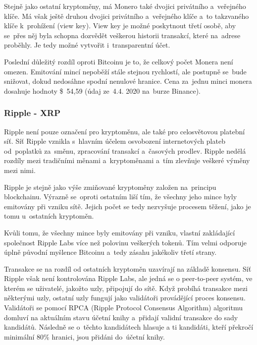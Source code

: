 \documentclass[thesis=B,czech]{FITthesis}[2019/03/21]
\begin{document}
Stejně jako ostatní kryptoměny, má Monero také dvojici privátního \linebreak a~veřejného klíče. Má však ještě druhou dvojici privátního a~veřejného klíče a~to takzvaného klíče k~prohížení (view key). View key je možné poskytnout třetí osobě, aby se~přes něj byla schopna dozvědět veškerou historii transakcí, které na~adrese proběhly. Je tedy možné vytvořit i~transparentní účet.

Poslední důležitý rozdíl oproti Bitcoinu je to, že celkový počet Monera není omezen. Emitování mincí nepoběží stále stejnou rychlostí, ale postupně se~bude snižovat, dokud nedosáhne spodní nenulové hranice. \cite{alza_monero} Cena za~jednu minci monera dosahuje hodnoty  \$~54,59 (údaj ze~4.4. 2020 na~burze Binance). \cite{binance_markets}

\subsubsection{Ripple - XRP}
Ripple není pouze označení pro kryptoměnu, ale také pro celosvětovou platební síť. Síť Ripple vznikla s~hlavním účelem osvobození internetových plateb od~poplatků za~směnu, zpracování transakcí a~časových prodlev. Ripple nedělá rozdíly mezi tradičními měnami a~kryptoměnami a~tím zlevňuje veškeré výměny mezi nimi.

Ripple je stejně jako výše zmiňované kryptoměny založen na~principu blockchainu. Výrazně se~oproti ostatním liší tím, že všechny jeho mince byly emitovány při vzniku sítě. Jejich počet se tedy nezvyšuje procesem těžení, jako je tomu u~ostatních kryptoměn.

Kvůli tomu, že všechny mince byly emitovány při vzniku, vlastní zakládající společnost Ripple Labs více než polovinu veškerých tokenů. Tím velmi odporuje úplně původní myšlence Bitcoinu a~tedy zásahu jakékoliv třetí strany. \cite{alza_ripple}

Transakce se na rozdíl od ostatních kryptoměn uzavírají na základě konsensu. Síť Ripple však není kontrolována Ripple Labs, ale jedná se o peer-to-peer systém, ve kterém se uživatelé, jakožto uzly, připojují do sítě. Když probíhá transakce mezi některými uzly, ostatní uzly fungují jako validátoři provádějící proces konsensu. Validátoři se pomocí RPCA (Ripple Protocol Consensus Algorithm) algoritmu domluví na aktuálním stavu účetní knihy a~přidají validní transakce do sady kandidátů. Následně se o~těchto kandidátech hlasuje a ti kandidáti, kteří překročí minimální 80\% hranici, jsou přidáni do~účetní knihy. \cite{RPCA}
\end{document}
